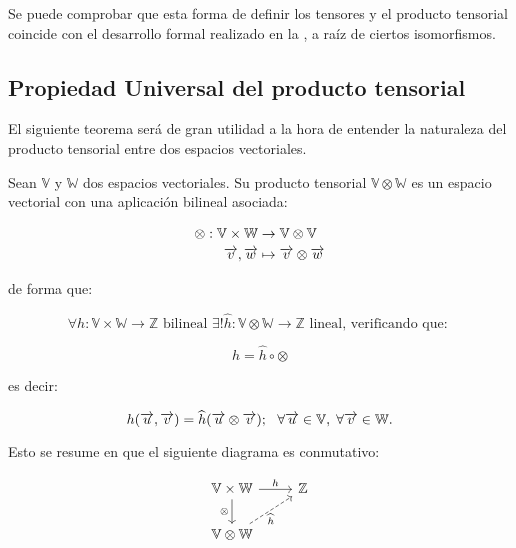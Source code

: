 \begin{observacion}
    Se puede comprobar que esta forma de definir los tensores y el producto tensorial coincide con el desarrollo formal realizado en la , a raíz de ciertos isomorfismos.
\end{observacion}

\subsection{Propiedad Universal del producto tensorial}

El siguiente teorema será de gran utilidad a la hora de entender la naturaleza del producto tensorial entre dos espacios vectoriales.

\begin{teorema} Sean $\mathbb{V}$ y $\mathbb{W}$ dos espacios vectoriales. Su producto tensorial $\mathbb{V} \otimes \mathbb{W}$ es un espacio vectorial con una aplicación bilineal asociada:

    \begin{equation}
        \begin{split}
            \otimes : \mathbb{V} \times \mathbb{W} &\to \mathbb{V} \otimes \mathbb{V} \\
            \overrightarrow{v}, \overrightarrow{w} & \mapsto \overrightarrow{v} \otimes \overrightarrow{w}
        \end{split}
    \end{equation}

    de forma que:

    \begin{equation}
        \forall h: \mathbb{V} \times \mathbb{W} \to \mathbb{Z} \text{  bilineal  } \exists! \widehat{h}: \mathbb{V} \otimes \mathbb{W} \to \mathbb{Z} \text{  lineal, verificando que: }
    \end{equation}

    \begin{equation}
        h = \widehat{h} \circ \otimes
    \end{equation}

    es decir:

    \begin{equation}
        h(\overrightarrow{u}, \overrightarrow{v}) = \widehat{h}(\overrightarrow{u} \otimes \overrightarrow{v});
        \ \  \forall \overrightarrow{u} \in \mathbb{V}, \; \forall \overrightarrow{v} \in \mathbb{W}.
    \end{equation}

    Esto se resume en que el siguiente diagrama es conmutativo:

    \begin{equation}
        \begin{tikzcd}
            \mathbb{V} \times \mathbb{W} \ar{r}{h} \ar{d}[left]{\otimes} & \mathbb{Z} \\
            \mathbb{V} \otimes \mathbb{W} \ar[dashed]{ur}[right, below]{\widehat{h}}
        \end{tikzcd}
    \end{equation}

\end{teorema}

